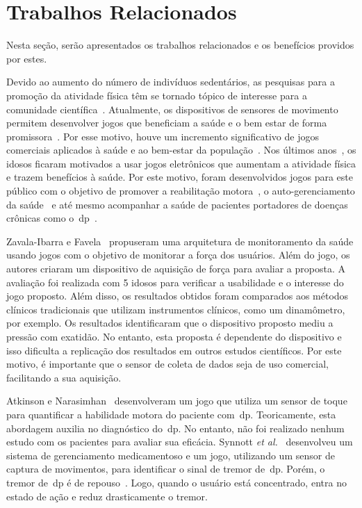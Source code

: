 \section{Trabalhos Relacionados}\label{section:trabalhos_relacionados}
Nesta seção, serão apresentados os trabalhos relacionados e os benefícios providos por estes.

Devido ao aumento do número de indivíduos sedentários, as pesquisas para a promoção da atividade física têm se tornado tópico de interesse para a comunidade científica~\cite{bartolome11,Mandryk2014}. Atualmente, os dispositivos de sensores de movimento permitem desenvolver jogos que beneficiam a saúde e o bem estar de forma promissora~\cite{seriousgameolder2015}. Por esse motivo, houve um incremento significativo de jogos comerciais aplicados à saúde e ao bem-estar da população~\cite{wiiassesspark2016}. Nos últimos anos~\cite{physicalactivityolder2014}, os idosos ficaram motivados a usar jogos eletrônicos que aumentam a atividade física e trazem benefícios à saúde. Por este motivo, foram desenvolvidos jogos para este público com o objetivo de promover a reabilitação motora~\cite{cloudrehabi2014}, o auto-gerenciamento da saúde~\cite{seriousgameolder2015} e até mesmo acompanhar a saúde de pacientes portadores de doenças crônicas como o~\ac{dp}~\cite{synnott_wiipd_2012,sacbespoke2014}. 

Zavala-Ibarra e Favela~\cite{ambientgameolder2012} propuseram uma arquitetura de monitoramento da saúde usando jogos com o objetivo de monitorar a força dos usuários. Além do jogo, os autores criaram um dispositivo de aquisição de força para avaliar a proposta. A avaliação foi realizada com 5 idosos para verificar a usabilidade e o interesse do jogo proposto. Além disso, os resultados obtidos foram comparados aos métodos clínicos tradicionais que utilizam instrumentos clínicos, como um dinamômetro, por exemplo. Os resultados identificaram que o dispositivo proposto mediu a pressão com exatidão. No entanto, esta proposta é dependente do dispositivo e isso dificulta a replicação dos resultados em outros estudos científicos. Por este motivo, é importante que o sensor de coleta de dados seja de uso comercial, facilitando a sua aquisição. 

Atkinson e Narasimhan~\cite{atkinson2010} desenvolveram um jogo que utiliza um sensor de toque para quantificar a habilidade motora do paciente com~\ac{dp}. Teoricamente, esta abordagem auxilia no diagnóstico do~\ac{dp}. No entanto, não foi realizado nenhum estudo com os pacientes para avaliar sua eficácia. Synnott \textit{et al.}~\cite{synnott_wiipd_2012} desenvolveu um sistema de gerenciamento medicamentoso e um jogo, utilizando um sensor de captura de movimentos, para identificar o sinal de tremor de~\ac{dp}. Porém, o tremor de~\ac{dp} é de repouso~\cite{national2006parkinson}. Logo, quando o usuário está concentrado, entra no estado de ação e reduz drasticamente o tremor.

